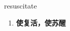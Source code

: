 
\begin{frame}
{\huge resuscitate}
\begin{center}
\begin{enumerate}\Large
  \item \textbf{使复活，使苏醒}
\end{enumerate}
\end{center}
\end{frame}
